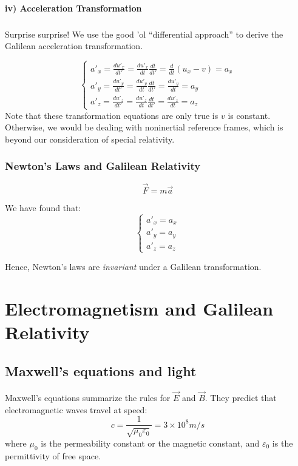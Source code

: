 \documentclass[a4paper,11pt]{article}
\numberwithin{equation}{section}
\begin{document}
 \paragraph{\indent iv) Acceleration Transformation}
 \subparagraph{}
 Surprise surprise! We use the good 'ol ``differential approach'' to derive the Galilean acceleration transformation.
 
  \begin{equation} \label{eq:22}
  \begin{cases} 
  a'_{x}=\frac{du'_{x}}{dt'}=\frac{du'_{x}}{dt}\frac{dt}{dt'}=\frac{d}{dt}{(u_{x}-v)}=a_{x} \\
  a'_{y}=\frac{du'_{y}}{dt'}=\frac{du'_{y}}{dt}\frac{dt}{dt'}=\frac{du'_{y}}{dt}=a_{y} \\ 
  a'_{z}=\frac{du'_{z}}{dt'}=\frac{du'_{z}}{dt}\frac{dt}{dt'}=\frac{du'_{z}}{dt}=a_{z}
  \end{cases}
  \end{equation}
  Note that these transformation equations are only true is $v$ is constant. Otherwise, we would be dealing with noninertial reference frames, which is beyond our consideration of special relativity. 
 
 \subsubsection{Newton's Laws and Galilean Relativity}
 
 \begin{equation} \label{eq:23}
 \vec{F} = m\vec{a}
 \end{equation}
 
 \noindent We have found that:
  \begin{equation} \label{eq:24}
  \begin{cases} 
  a'_{x}=a_{x} \\
  a'_{y}=a_{y} \\ 
  a'_{z}=a_{z}
  \end{cases}
  \end{equation}
  
 \noindent Hence, Newton's laws are \textit{invariant} under a Galilean transformation.
 
 \newpage
 
 \section{Electromagnetism and Galilean Relativity}
 
 \subsection{Maxwell's equations and light}
 Maxwell's equations summarize the rules for $\vec{E}$ and $\vec{B}$. They predict that electromagnetic waves travel at speed:
 \begin{equation}\label{eq:2.1}
 c = \frac{1}{\sqrt{\mu_{0}\varepsilon_{0}}} = 3\times10^{8} m/s
 \end{equation}
 where $\mu_{0}$ is the permeability constant or the magnetic constant, and $\varepsilon_{0}$ is the permittivity of free space. 
 
\end{document}
